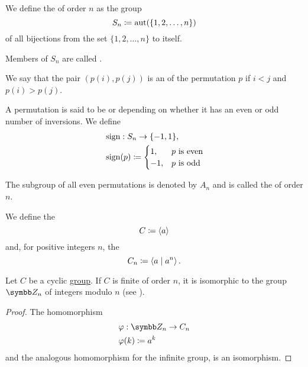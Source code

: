 \begin{definition}\label{def:symmetric_group}
  We define the  of order \( n \) as the group
  \begin{equation*}
    S_n \coloneqq \operatorname{aut}(\{ 1, 2, \ldots, n \})
  \end{equation*}
  of all bijections from the set \( \{ 1, 2, \ldots, n \} \) to itself.

  Members of \( S_n \) are called .

  We say that the pair \( (p(i), p(j)) \) is an  of the permutation \( p \) if \( i < j \) and \( p(i) > p(j) \).

  A permutation is said to be  or  depending on whether it has an even or odd number of inversions. We define
  \begin{align*}
     & \operatorname{sign}: S_n \to \{ -1, 1 \},                   \\
     & \operatorname{sign}(p) \coloneqq \begin{cases}
      1,  & p \text{ is even} \\
      -1, & p \text{ is odd}
    \end{cases}
  \end{align*}

  The subgroup of all even permutations is denoted by \( A_n \) and is called the  of order \( n \).
\end{definition}

\begin{definition}\label{def:cyclic_group}
  We define the 
  \begin{equation*}
    C \coloneqq \left\langle a \right\rangle
  \end{equation*}
  and, for positive integers \( n \), the 
  \begin{equation*}
    C_n \coloneqq \left\langle a \mid a^n \right\rangle.
  \end{equation*}
\end{definition}

\begin{proposition}\label{thm:cyclic_group_isomorphic_to_integers_modulo_n}
  Let \( C \) be a cyclic \hyperref[def:cyclic_group]{group}. If \( C \) is finite of order \( n \), it is isomorphic to the group \( \BZ_n \) of integers modulo \( n \) (see ).
\end{proposition}
\begin{proof}
  The homomorphism
  \begin{align*}
     & \varphi: \BZ_n \to C_n   \\
     & \varphi(k) \coloneqq a^k
  \end{align*}
  and the analogous homomorphism for the infinite group, is an isomorphism.
\end{proof}

